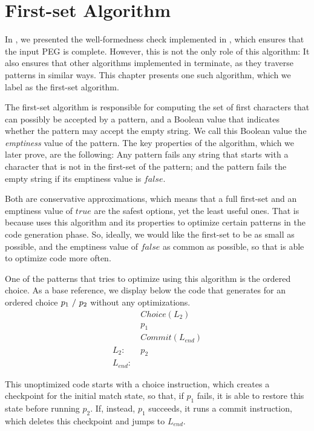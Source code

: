 \chapter{First-set Algorithm}
\label{chapter:first-set}

In ,
we presented the well-formedness check
implemented in \lpeg{},
which ensures that the input PEG is complete.
However, this is not the only role of this algorithm:
It also ensures that other algorithms
implemented in \lpeg{} terminate,
as they traverse patterns in similar ways.
This chapter presents one such algorithm,
which we label as the first-set algorithm.

The first-set algorithm is responsible for
computing the set of first characters that
can possibly be accepted by a pattern,
and a Boolean value
that indicates whether the pattern may
accept the empty string.
We call this Boolean value the
\emph{emptiness} value of the pattern.
The key properties of the algorithm,
which we later prove,
are the following:
Any pattern fails any string that starts
with a character that is not in the first-set
of the pattern;
and the pattern fails the empty string
if its emptiness value is $false$.

Both are conservative approximations,
which means that a full first-set
and an emptiness value of $true$ are
the safest options, yet the least useful ones.
That is because \lpeg{} uses this algorithm and its properties
to optimize certain patterns in the code generation phase.
So, ideally, we would like the first-set to be as small as possible,
and the emptiness value of $false$ as common as possible,
so that \lpeg{} is able to optimize code more often.

One of the patterns that \lpeg{} tries to optimize
using this algorithm is the ordered choice.
As a base reference, we display below the code
that \lpeg{} generates for an ordered choice $p_1\ /\ p_2$
without any optimizations.
\begin{align*}
    & Choice(L_2) \\
    & p_1 \\
    & Commit(L_{end}) \\
    L_2:\ & p_2 \\
    L_{end}:\ &
\end{align*}

This unoptimized code starts with a choice instruction,
which creates a checkpoint for the initial match state,
so that, if $p_1$ fails,
it is able to restore this state
before running $p_2$.
If, instead, $p_1$ succeeds, it runs a commit instruction,
which deletes this checkpoint and jumps to $L_{end}$.

